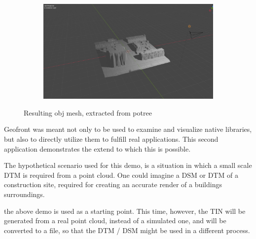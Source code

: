 \begin{figure}
  \begin{subfigure}[b]{0.90\linewidth}
    \centering
    \includegraphics[width=\linewidth]{potree-7.PNG}
  \end{subfigure}%
  \caption{Resulting obj mesh, extracted from potree}
  \label{fig:potree-result}
\end{figure}

Geofront was meant not only to be used to examine and visualize native libraries, but also to directly utilize them to fulfill real applications.
This second application demonstrates the extend to which this is possible. 

The hypothetical scenario used for this demo, is a situation in which a small scale DTM is required from a point cloud. 
One could imagine a DSM or DTM of a construction site, required for creating an accurate render of a buildings surroundings. 

the above  demo is used as a starting point. 
This time, however, the TIN will be generated from a real point cloud, instead of a simulated one, and will be converted to a  file, so that the DTM / DSM might be used in a different process. 

